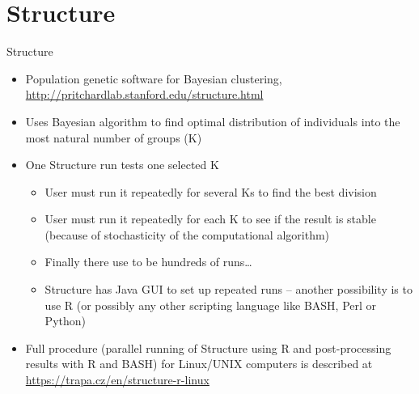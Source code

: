 \documentclass[compress, ucs, xelatex, 11pt, xcolor=svgnames,
  hyperref={
    bookmarks=true,
    unicode=true,
    colorlinks=true,
    pdftitle={Molecular data in R},
    plainpages=false,
    pdfauthor={Vojtech Zeisek},
    pdfsubject={Course about phylogeny and evolution in R},
    pdfcreator={XeLaTeX},
    pdfkeywords={R, evolution, phylogeny, molecular data},
    linkcolor=Tomato,
    anchorcolor=SaddleBrown,
    citecolor=Goldenrod,
    filecolor=DarkMagenta,
    menucolor=Sienna,
    urlcolor=DarkTurquoise,
    pdftex},
  url={hyphens, lowtilde} %
  ]{beamer}
\begin{document}
\section{Structure}

\begin{frame}{Structure}
  \label{structure}
  \begin{itemize}
    \item Population genetic software for Bayesian clustering, \url{http://pritchardlab.stanford.edu/structure.html}
    \item Uses Bayesian algorithm to find optimal distribution of individuals into the most natural number of groups (K)
    \item One Structure run tests one selected K
    \begin{itemize}
      \item User must run it repeatedly for several Ks to find the best division
      \item User must run it repeatedly for each K to see if the result is stable (because of stochasticity of the computational algorithm)
      \item Finally there use to be hundreds of runs\ldots
      \item Structure has Java GUI to set up repeated runs -- another possibility is to use R (or possibly any other scripting language like BASH, Perl or Python)
    \end{itemize}
    \item Full procedure (parallel running of Structure using R and post-processing results with R and BASH) for Linux/UNIX computers is described at \url{https://trapa.cz/en/structure-r-linux}
  \end{itemize}
\end{frame}
\end{document}
